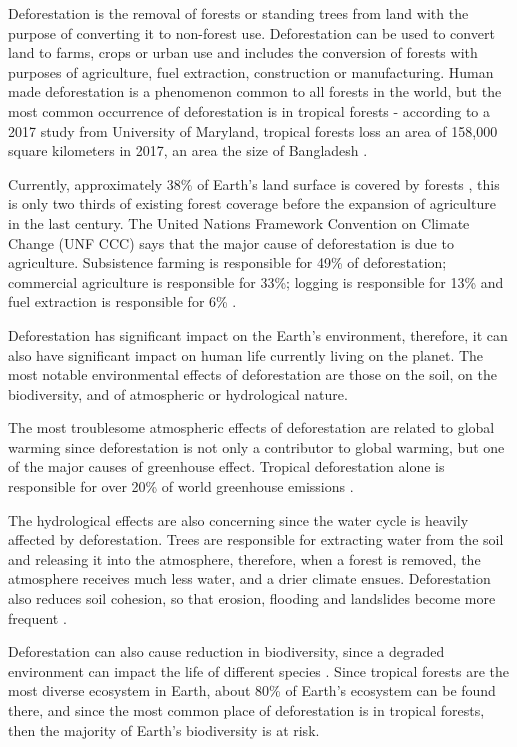 Deforestation is the removal of forests or standing trees from land
with the purpose of converting it to non-forest use. Deforestation can be used to convert land to farms,
crops or urban use and includes the conversion of forests with purposes of agriculture, fuel extraction,
construction or manufacturing. Human made deforestation is a phenomenon common to all forests in the world, but
the most common occurrence of deforestation is in tropical forests \cite{Alina} - according to a 2017 study from University of Maryland,
tropical forests loss an area of 158,000 square kilometers in 2017, an area the size of Bangladesh \cite{maryland}.

Currently, approximately 38\% of Earth's land surface is covered by forests \cite{WWF}, this is only two thirds of existing
forest coverage before the expansion of agriculture in the last century\cite{WID}. The United Nations Framework Convention on Climate Change
(UNF CCC) says that the major cause of deforestation is due to agriculture. Subsistence farming is responsible for 49\% of deforestation; commercial agriculture
is responsible for 33\%; logging is responsible for 13\% and fuel extraction is responsible for 6\% \cite{UNFCCC}.

Deforestation has significant impact on the Earth's environment, therefore, it can also have significant impact on human life currently living on the planet.
The most notable environmental effects of deforestation are those on the soil, on the biodiversity, and of atmospheric or hydrological nature.

The most troublesome atmospheric effects of deforestation are related to global warming since deforestation is not only a contributor to global warming, but
one of the major causes of greenhouse effect. Tropical deforestation alone is responsible for over 20\% of world greenhouse emissions \cite{Chirac}.

The hydrological effects are also concerning since the water cycle is heavily affected by deforestation. Trees are responsible for extracting water from the soil
and releasing it into the atmosphere, therefore, when a forest is removed, the atmosphere receives much less water, and a drier climate ensues. Deforestation also reduces soil cohesion,
so that erosion, flooding and landslides become more frequent \cite{Rogge}.

Deforestation can also cause reduction in biodiversity, since a degraded environment can impact the life of different species \cite{umich}. Since
tropical forests are the most diverse ecosystem in Earth, about 80\% of Earth's ecosystem can be found there, and since the most common place of deforestation
is in tropical forests, then the majority of Earth's biodiversity is at risk\cite{Mogato}.

